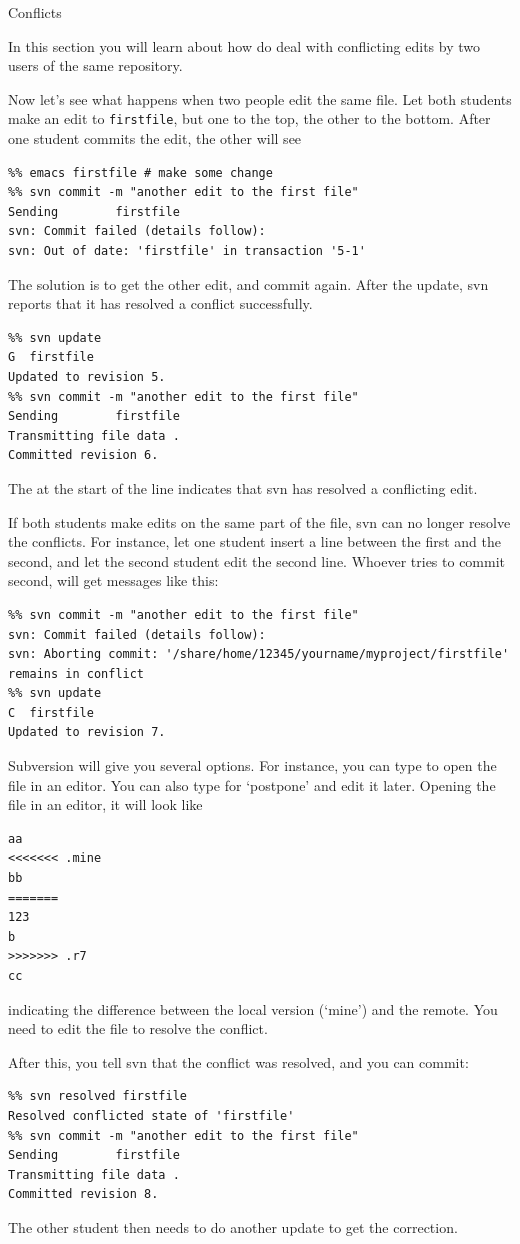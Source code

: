  {Conflicts}

\begin{purpose}
  In this section you will learn about how do deal with conflicting
  edits by two users of the same repository.
\end{purpose}

Now let's see what happens when two people edit the same file.
Let both students make an edit to \verb+firstfile+, but one to the
top, the other to the bottom. After one student commits the edit, the
other will see
\begin{verbatim}
%% emacs firstfile # make some change
%% svn commit -m "another edit to the first file"
Sending        firstfile
svn: Commit failed (details follow):
svn: Out of date: 'firstfile' in transaction '5-1'
\end{verbatim}
The solution is to get the other edit, and commit again. After the
update, svn reports that it has resolved a conflict successfully.
\begin{verbatim}
%% svn update
G  firstfile
Updated to revision 5.
%% svn commit -m "another edit to the first file"
Sending        firstfile
Transmitting file data .
Committed revision 6.
\end{verbatim}
The  at the start of the line indicates that svn has resolved a
conflicting edit.

If both students make edits on the same part of the file, svn can no
longer resolve the conflicts. For instance, let one student insert a
line between the first and the second, and let the second student edit
the second line. Whoever tries to commit second, will get messages
like this:
\begin{verbatim}
%% svn commit -m "another edit to the first file"
svn: Commit failed (details follow):
svn: Aborting commit: '/share/home/12345/yourname/myproject/firstfile' 
remains in conflict
%% svn update
C  firstfile
Updated to revision 7.
\end{verbatim}
Subversion will give you several options. For instance, you can type
 to open the file in an editor. You can also type  for
`postpone' and edit it later.
Opening the file in an editor, it will look like
\begin{verbatim}
aa
<<<<<<< .mine
bb
=======
123
b
>>>>>>> .r7
cc
\end{verbatim}
indicating the difference between the local version (`mine') and the
remote. You need to edit the file to resolve the conflict.

After this, you tell svn that the conflict was resolved, and
you can commit:
\begin{verbatim}
%% svn resolved firstfile
Resolved conflicted state of 'firstfile'
%% svn commit -m "another edit to the first file"
Sending        firstfile
Transmitting file data .
Committed revision 8.
\end{verbatim}
The other student then needs to do another update to get the
correction.

